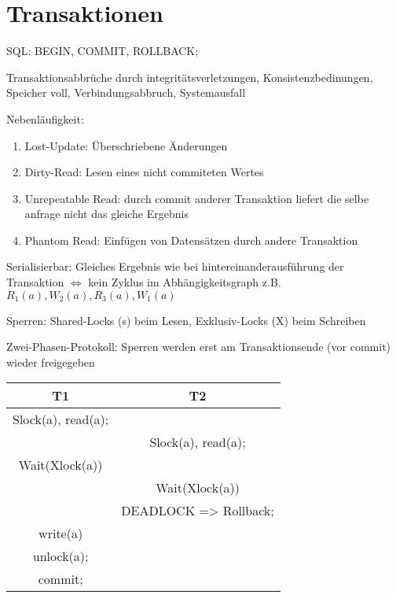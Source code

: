 \section*{Transaktionen}
SQL: BEGIN, COMMIT, ROLLBACK;

Transaktionsabbrüche durch integritätsverletzungen, Konsistenzbedinungen, Speicher voll, Verbindungsabbruch, Systemausfall

Nebenläufigkeit:
\begin{enumerate}
\item Lost-Update: Überschriebene Änderungen
\item Dirty-Read: Lesen eines nicht commiteten Wertes
\item Unrepeatable Read: durch commit anderer Transaktion liefert die selbe anfrage nicht das gleiche Ergebnis
\item Phantom Read: Einfügen von Datensätzen durch andere Transaktion
\end{enumerate}

Serialisierbar: Gleiches Ergebnis wie bei hintereinanderausführung der Transaktion
$\Leftrightarrow$ kein Zyklus im Abhängigkeitsgraph
z.B. $R_1(a), W_2(a), R_3(a), W_1(a)$



Sperren: Shared-Locks (s) beim Lesen, Exklusiv-Locks (X) beim Schreiben

Zwei-Phasen-Protokoll: Sperren werden erst am Transaktionsende (vor commit) wieder freigegeben

\begin{tabular}{|c|c|}
\hline
T1 & T2 \\
\hline
Slock(a), read(a); & \\
& Slock(a), read(a);\\
Wait(Xlock(a)) & \\
& Wait(Xlock(a))\\
& DEADLOCK => Rollback;\\
write(a)&\\
unlock(a);&\\
commit;&\\
\hline
\end{tabular}




